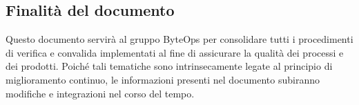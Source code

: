 \subsection{Finalità del documento}
Questo documento servirà al gruppo ByteOps per consolidare tutti i procedimenti di verifica e convalida implementati al fine di assicurare la qualità dei processi e dei prodotti. Poiché tali tematiche sono intrinsecamente legate al principio di miglioramento continuo, le informazioni presenti nel documento subiranno modifiche e integrazioni nel corso del tempo.